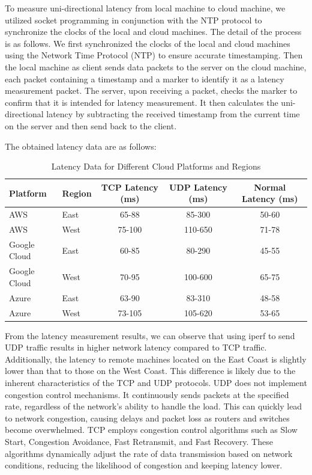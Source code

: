\documentclass[conference]{IEEEtran}
\begin{document}
To measure uni-directional latency from local machine to cloud machine, we utilized socket programming in conjunction with the NTP protocol to synchronize the clocks of the local and cloud machines. The detail of the process is as follows. We first synchronized the clocks of the local and cloud machines using the Network Time Protocol (NTP) to ensure accurate timestamping. Then the local machine as client sends data packets to the server on the cloud machine, each packet containing a timestamp and a marker to identify it as a latency measurement packet. The server, upon receiving a packet, checks the marker to confirm that it is intended for latency measurement. It then calculates the uni-directional latency by subtracting the received timestamp from the current time on the server and then send back to the client.

The obtained latency data are as follows:
\begin{table}[h!]
    \centering
    \setlength{\tabcolsep}{3pt} 
    \begin{tabular}{l l c c c}
        \toprule
        \textbf{Platform} & \textbf{Region} & \textbf{TCP Latency (ms)} & \textbf{UDP Latency (ms)} & \textbf{Normal Latency (ms)} \\
        \midrule
        AWS & East & 65-88 & 85-300 & 50-60 \\
        AWS & West & 75-100 & 110-650 & 71-78 \\
        Google Cloud & East & 60-85 & 80-290 & 45-55 \\
        Google Cloud & West & 70-95 & 100-600 & 65-75 \\
        Azure & East & 63-90 & 83-310 & 48-58 \\
        Azure & West & 73-105 & 105-620 & 53-65 \\
        \bottomrule
    \end{tabular}
    \caption{Latency Data for Different Cloud Platforms and Regions}
    \label{tab:latency-data}
\end{table}

From the latency measurement results, we can observe that using iperf to send UDP traffic results in higher network latency compared to TCP traffic. Additionally, the latency to remote machines located on the East Coast is slightly lower than that to those on the West Coast. This difference is likely due to the inherent characteristics of the TCP and UDP protocols. UDP does not implement congestion control mechanisms. It continuously sends packets at the specified rate, regardless of the network's ability to handle the load. This can quickly lead to network congestion, causing delays and packet loss as routers and switches become overwhelmed. TCP employs congestion control algorithms such as Slow Start, Congestion Avoidance, Fast Retransmit, and Fast Recovery. These algorithms dynamically adjust the rate of data transmission based on network conditions, reducing the likelihood of congestion and keeping latency lower.
\end{document}
